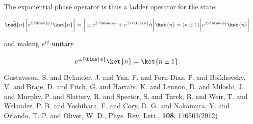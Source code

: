 \begin{thebibliography}{99}
 \vspace{-1em}
 
 The exponential phase operator is thus a ladder operator for the  state:
 
 \vspace{-1em}
 
{\scriptsize \begin{equation}\label{eq:ab2} 
\hat{\red{n}}\bigg[e^{\pm i\hat{\blue{\phi}}}\ket{n}\bigg] = \bigg[\pm e^{\pm i\hat{\blue{\phi}}} + e^{\pm i\hat{\blue{\phi}}}\hat{n}\bigg]\ket{n} =
 (n\pm 1)\bigg[e^{\pm i\hat{\blue{\phi}}}\ket{n}\bigg]
\end{equation}}

\vspace{-1em}

and making $ e^{i\phi} $ unitary

\vspace{-0.2em}

{\scriptsize \begin{equation}\label{eq:ab3}
	e^{\pm i\hat{\blue{\phi}}}\ket{n} = \ket{n \pm 1}.
\end{equation}}


{Gustavsson, S. and Bylander, J. and Yan, F. and Forn-D\'{\i}az, P. and Bolkhovsky, V. and Braje, D. and Fitch, G. and Harrabi, K. and Lennon, D. and Miloshi, J. and Murphy, P. and Slattery, R. and Spector, S. and Turek, B. and Weir, T. and Welander, P. B. and Yoshihara, F. and Cory, D. G. and Nakamura, Y. and Orlando, T. P. and Oliver, W. D.}, {Phys. Rev. Lett.}, \textbf{108}, 170503(2012)



\end{thebibliography}
